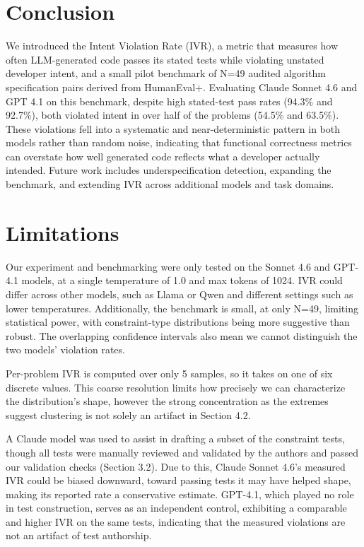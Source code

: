 \documentclass[11pt]{article}
\begin{document}
\section{Conclusion}

We introduced the Intent Violation Rate (IVR), a metric that measures how often LLM-generated code passes its stated tests while violating unstated developer intent, and a small pilot benchmark of N=49 audited algorithm specification pairs derived from HumanEval+. Evaluating Claude Sonnet 4.6 and GPT 4.1 on this benchmark, despite high stated-test pass rates (94.3\% and 92.7\%), both violated intent in over half of the problems (54.5\% and 63.5\%). These violations fell into a systematic and near-deterministic pattern in both models rather than random noise, indicating that functional correctness metrics can overstate how well generated code reflects what a developer actually intended. Future work includes underspecification detection, expanding the benchmark, and extending IVR across additional models and task domains. 

\section*{Limitations}

Our experiment and benchmarking were only tested on the Sonnet 4.6 and GPT-4.1 models, at a single temperature of 1.0 and max tokens of 1024. IVR could differ across other models, such as Llama or Qwen and different settings such as lower temperatures. Additionally, the benchmark is small, at only N=49, limiting statistical power, with constraint-type distributions being more suggestive than robust. The overlapping confidence intervals also mean we cannot distinguish the two models' violation rates. 

Per-problem IVR is computed over only 5 samples, so it takes on one of six discrete values. This coarse resolution limits how precisely we can characterize the distribution's shape, however the strong concentration as the extremes suggest clustering is not solely an artifact in Section 4.2. 

A Claude model was used to assist in drafting a subset of the constraint tests, though all tests were manually reviewed and validated by the authors and passed our validation checks (Section 3.2). Due to this, Claude Sonnet 4.6's measured IVR could be biased downward, toward passing tests it may have helped shape, making its reported rate a conservative estimate. GPT-4.1, which played no role in test construction, serves as an independent control, exhibiting a comparable and higher IVR on the same tests, indicating that the measured violations are not an artifact of test authorship. 
\end{document}
